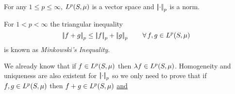 \documentclass{article}
\begin{document}
\begin{theorem}
	For any $1\leq p\leq\infty$, $L^{p}(S,\mu)$ is a vector space and $\left|\negthinspace\left|\cdot\right|\negthinspace\right|_{p}$ is a norm.
\end{theorem}
\begin{remark}
	For $1<p<\infty$ the triangular inequality
	\begin{equation*}
		\left|\negthinspace\left|f+g\right|\negthinspace\right|_p\leq\left|\negthinspace\left|f\right|\negthinspace\right|_p+\left|\negthinspace\left|g\right|\negthinspace\right|_p\qquad\forall\, f,g\in L^{p}(S,\mu)
	\end{equation*}
	is known as \emph{Minkowski's Inequality}.
\end{remark}
\begin{fancyproof}
	We already know that if $f\in L^{p}(S,\mu)$ then $\lambda f\in L^{p}(S,\mu)$. Homogeneity and uniqueness are also existent for $\left|\negthinspace\left|\cdot\right|\negthinspace\right|_p$ so we only need to prove that if $f,g\in L^{p}(S,\mu)$ then $f+g\in L^{p}(S,\mu)$ \underline{and}
\end{fancyproof}
\end{document}
